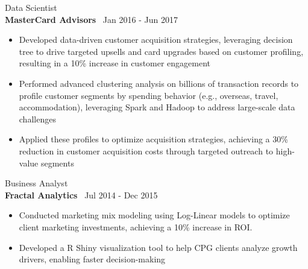 \documentclass[a4paper,10pt]{article}
\begin{document}
{\large Data Scientist} \\
\textbf{MasterCard Advisors} \hfill \faCalendar \, Jan 2016 - Jun 2017
\begin{itemize}[noitemsep, topsep=0pt]
    \item Developed data-driven customer acquisition strategies, leveraging decision tree to drive targeted upsells and card upgrades based on customer profiling, resulting in a 10\% increase in customer engagement
    \item Performed advanced clustering analysis on billions of transaction records to profile customer segments by spending behavior (e.g., overseas, travel, accommodation), leveraging Spark and Hadoop to address large-scale data challenges
    \item Applied these profiles to optimize acquisition strategies, achieving a 30\% reduction in customer acquisition costs through targeted outreach to high-value segments
\end{itemize}

{\large Business Analyst} \\
\textbf{Fractal Analytics} \hfill \faCalendar \, Jul 2014 - Dec 2015
\begin{itemize}[noitemsep, topsep=0pt]
    \item Conducted marketing mix modeling using Log-Linear models to optimize client marketing investments, achieving a 10\% increase in ROI.
    \item Developed a R Shiny visualization tool to help CPG clients analyze growth drivers, enabling faster decision-making
\end{itemize}
\end{document}
